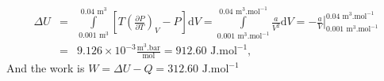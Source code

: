 \documentclass[calculator,allquestions,datasheet,mock,solutions]{exam_newMarcus2}
\newcommand{\frc}{\displaystyle\frac}
\renewcommand{\d}[1]{\mathrm{d} #1 }
\begin{document}
\begin{question}
\begin{enumerate}[(a)]
{       \begin{eqnarray}
         \Delta U &=& \int\limits_{0.001\text{ m}^{3}}^{0.04\text{ m}^{3}}\left[T\left(\frc{\partial P}{\partial T}\right)_{V}-P\right]\d V = \int\limits_{0.001\text{ m}^{3}.\text{mol}^{-1}}^{0.04\text{ m}^{3}.\text{mol}^{-1}} \frc{a}{V^{2}} \d V = -\left.\frc{a}{V}\right|_{0.001\text{ m}^{3}.\text{mol}^{-1}}^{0.04\text{ m}^{3}.\text{mol}^{-1}} \nonumber \\
                  &=& 9.126\times 10^{-3}\frc{\text{m}^{3}.\text{bar}}{\text{mol}} = 912.60\text{ J.mol}^{-1}, \nonumber
       \end{eqnarray}
       And the work is $W= \Delta U - Q=312.60\text{ J.mol}^{-1}$~

}
%
\end{enumerate} 
%
\end{question}

\clearpage
\end{document}
